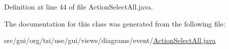 Definition at line 44 of file Action\-Select\-All.\-java.



The documentation for this class was generated from the following file\-:\begin{DoxyCompactItemize}
\item 
src/gui/org/tzi/use/gui/views/diagrams/event/\hyperlink{_action_select_all_8java}{Action\-Select\-All.\-java}\end{DoxyCompactItemize}
